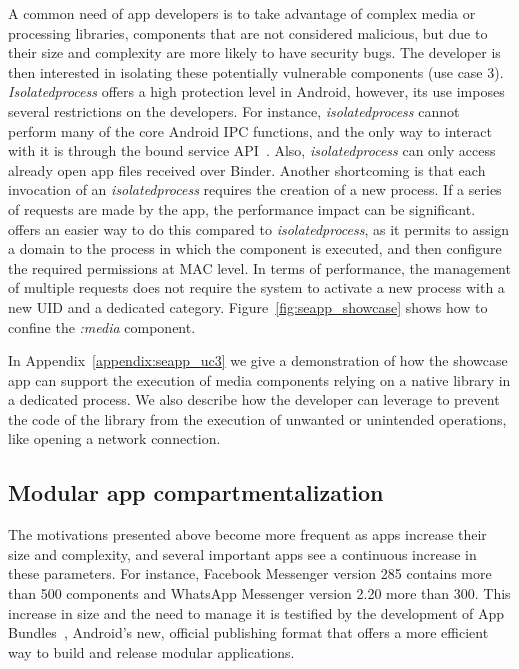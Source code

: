 A common need of app developers is to take advantage of complex media
or processing libraries, components that are not considered malicious,
but due to their size and complexity are more likely to have security
bugs.  The developer is then interested in isolating these potentially
vulnerable components (use case 3).  {\em Isolatedprocess} offers a
high protection level in Android, however, its use imposes several
restrictions on the developers.  For instance, {\em isolatedprocess}
cannot perform many of the core Android IPC functions, and the only
way to interact with it is through the bound service
API~\cite{seapp_bound_service_api}.  Also, {\em isolatedprocess} can
only access already open app files received over Binder.  Another
shortcoming is that each invocation of an {\em isolatedprocess}
requires the creation of a new process.  If a series of requests are
made by the app, the performance impact can be significant.  \pap
offers an easier way to do this compared to {\em isolatedprocess}, as
it permits to assign a domain to the process in which the component is
executed, and then configure the required permissions at MAC level.
In terms of performance, the management of multiple requests does not
require the system to activate a new process with a new UID and a
dedicated \sel category.  Figure~\ref{fig:seapp_showcase} shows how to
confine the {\em :media} component.

In Appendix~\ref{appendix:seapp_uc3} we give a demonstration of how
the showcase app can support the execution of media components relying
on a native library in a dedicated process. We also describe how the
developer can leverage \pap to prevent the code of the library from
the execution of unwanted or unintended operations, like opening a
network connection.


\subsection{Modular app compartmentalization}

The motivations presented above become more frequent as apps increase
their size and complexity, and several important apps see a continuous
increase in these parameters.  For instance, Facebook Messenger
version 285 contains more than 500 components and WhatsApp Messenger
version 2.20 more than 300.  This increase in size and the need to
manage it is testified by the development of App
Bundles~\cite{seapp_app_bundles}, Android's new, official publishing
format that offers a more efficient way to build and release modular
applications.

